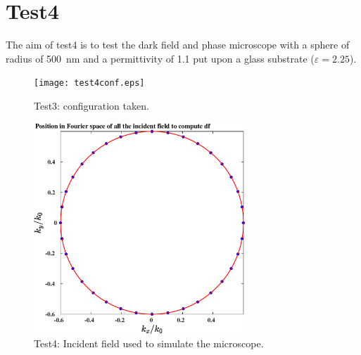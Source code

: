 \section{Test4}

The aim of test4 is to test the dark field and phase microscope with a
sphere of radius of 500~nm and a permittivity of 1.1 put upon a glass
substrate ($\varepsilon=2.25$).

\begin{figure}[H]
\begin{center}
  \texttt{[image: test4conf.eps]}
\end{center}
\caption{Test3: configuration taken.}
\end{figure}
\begin{figure}[H]
\begin{center}
  \includegraphics*[width=8.0cm,draft=false]{test4angleincdf.eps}
\end{center}
\caption{Test4: Incident field used to simulate the microscope.}
\end{figure}

